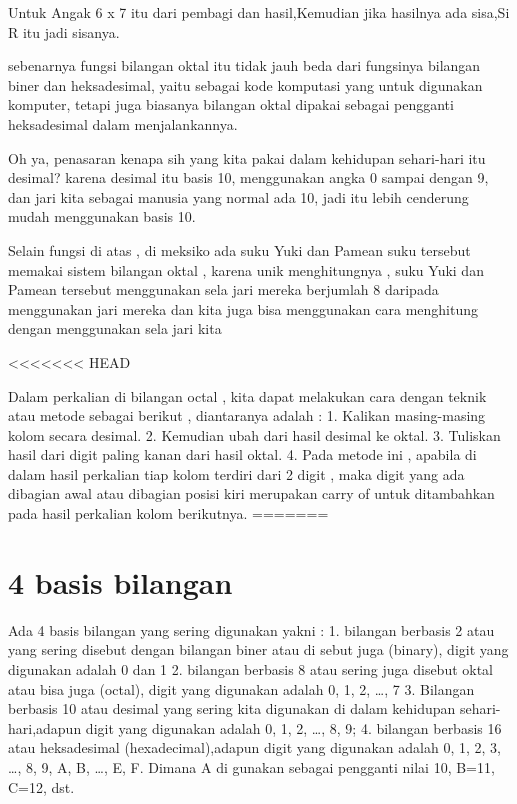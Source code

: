 Untuk Angak 6 x 7 itu dari pembagi dan hasil,Kemudian jika hasilnya ada sisa,Si R itu jadi sisanya.


sebenarnya fungsi bilangan oktal itu tidak jauh beda dari fungsinya bilangan biner dan heksadesimal, yaitu sebagai kode komputasi yang untuk digunakan komputer, tetapi juga biasanya bilangan oktal dipakai sebagai pengganti heksadesimal dalam menjalankannya.

Oh ya, penasaran kenapa sih yang kita pakai dalam kehidupan sehari-hari itu desimal? karena desimal itu basis 10, menggunakan angka 0 sampai dengan 9, dan jari kita sebagai manusia yang normal ada 10, jadi itu lebih cenderung  mudah menggunakan basis 10.

Selain fungsi di atas  , di meksiko ada suku Yuki dan Pamean suku tersebut memakai sistem bilangan oktal , karena unik menghitungnya , suku Yuki dan Pamean tersebut menggunakan sela jari mereka berjumlah 8 daripada menggunakan jari mereka dan kita juga bisa menggunakan cara menghitung dengan menggunakan sela jari kita 

<<<<<<< HEAD

Dalam perkalian di bilangan octal , kita dapat melakukan cara dengan teknik atau metode sebagai berikut , diantaranya adalah :
1.	Kalikan masing-masing kolom secara desimal.
2.	Kemudian ubah dari hasil desimal ke oktal.
3.	Tuliskan hasil dari digit paling kanan dari hasil oktal.
4.	Pada metode ini , apabila di dalam hasil perkalian tiap kolom terdiri dari 2 digit , maka digit yang ada dibagian awal atau dibagian posisi kiri merupakan carry of untuk ditambahkan pada hasil perkalian kolom berikutnya.
=======
\section{4 basis bilangan }

Ada 4 basis bilangan yang sering digunakan yakni :
1. bilangan berbasis 2 atau yang sering disebut dengan bilangan biner atau di sebut juga (binary), digit yang digunakan adalah 0 dan 1
2. bilangan berbasis 8 atau sering juga disebut oktal atau bisa juga (octal), digit yang digunakan adalah 0, 1, 2, …, 7
3. Bilangan berbasis 10 atau desimal yang sering kita digunakan di dalam kehidupan sehari-hari,adapun digit yang digunakan adalah 0, 1, 2, …, 8, 9; 
4. bilangan berbasis 16 atau heksadesimal (hexadecimal),adapun digit yang digunakan adalah 0, 1, 2, 3, …, 8, 9, A, B, …, E, F. Dimana A di gunakan sebagai pengganti nilai 10, B=11, C=12, dst.

